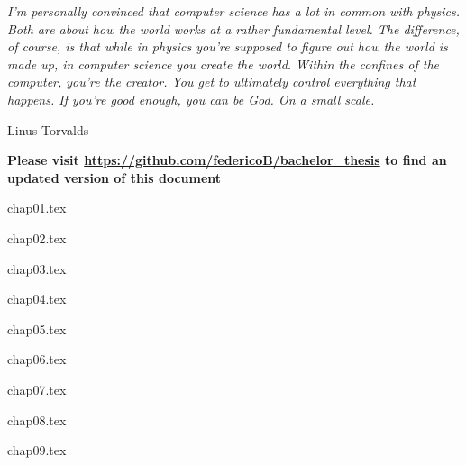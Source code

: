 \documentclass[a4paper,11pt,leqno,openbib,oldfontcommands]{memoir} %
\newcommand{\clearemptydoublepage}{\newpage{\thispagestyle{empty}\cleardoublepage}}
\begin{document}
%
% 
% 
% 
% 
\frontmatter
{}
%

\clearemptydoublepage
%

\clearpage
%
\epigraph{\textit{I'm personally convinced that computer science has a lot in common with physics. Both are about how the world works at a rather fundamental level. The difference, of course, is that while in physics you're supposed to figure out how the world is made up, in computer science you create the world. Within the confines of the computer, you're the creator. You get to ultimately control everything that happens. If you're good enough, you can be God. On a small scale.}}{Linus Torvalds}
%
\clearpage
%
\renewcommand{\contentsname}{Table of Contents}
\tableofcontents
\vfill
\justify
\textbf{Please visit \url{https://github.com/federicoB/bachelor_thesis} to find an updated version of this document}
\clearpage


%
\mainmatter
%
{chap01.tex}

{chap02.tex}

{chap03.tex}

{chap04.tex}

{chap05.tex}

{chap06.tex}

{chap07.tex}

{chap08.tex}

{chap09.tex}


\clearpage
%
\backmatter

\renewcommand{\bibname}{References}
\printbibliography
%
%   
\end{document}
